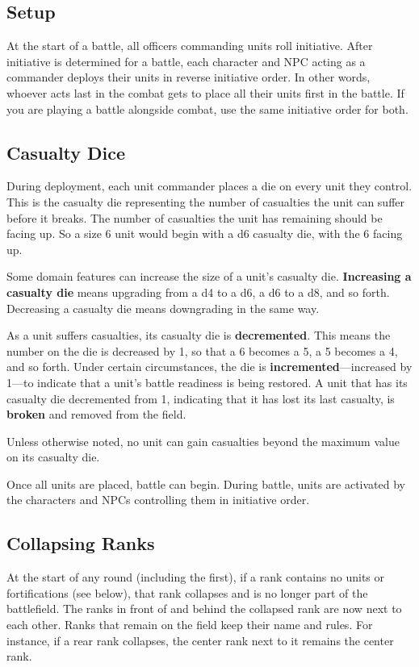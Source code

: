 \documentclass[10pt,a4paper,twoside,bg=print,twocolumn,openany,nodeprecatedcode]{dndbook}
\begin{document}
\subsection{Setup}
At the start of a battle, all officers commanding units roll initiative. After initiative is determined for a battle, each character and NPC acting as a commander deploys their units in reverse initiative order. In other words, whoever acts last in the combat gets to place all their units first in the battle. If you are playing a battle alongside combat, use the same initiative order for both.

\subsection{Casualty Dice}
During deployment, each unit commander places a die on every unit they control. This is the casualty die representing the number of casualties the unit can suffer before it breaks. The number of casualties the unit has remaining should be facing up. So a size 6 unit would begin with a d6 casualty die, with the 6 facing up.

Some domain features can increase the size of a unit's casualty die. \textbf{Increasing a casualty die} means upgrading from a d4 to a d6, a d6 to a d8, and so forth. Decreasing a casualty die means downgrading in the same way.

As a unit suffers casualties, its casualty die is \textbf{decremented}. This means the number on the die is decreased by 1, so that a 6 becomes a 5, a 5 becomes a 4, and so forth. Under certain circumstances, the die is \textbf{incremented}—increased by 1—to indicate that a unit's battle readiness is being restored. A unit that has its casualty die decremented from 1, indicating that it has lost its last casualty, is \textbf{broken} and removed from the field.

Unless otherwise noted, no unit can gain casualties beyond the maximum value on its casualty die.

Once all units are placed, battle can begin. During battle, units are activated by the characters and NPCs controlling them in initiative order.

\subsection{Collapsing Ranks}
At the start of any round (including the first), if a rank contains no units or fortifications (see below), that rank collapses and is no longer part of the battlefield. The ranks in front of and behind the collapsed rank are now next to each other. Ranks that remain on the field keep their name and rules. For instance, if a rear rank collapses, the center rank next to it remains the center rank.
\end{document}
